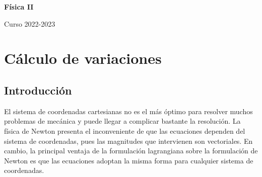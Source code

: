 \documentclass[12pt]{report}
\begin{document}
\newtheorem{proposition}{Proposición}[chapter]
\newtheorem{corollary}{Corolario}[chapter]
\newtheorem{theorem}{Teorema}[chapter]
\theoremstyle{definition}
\newtheorem{definition}{Definición}[chapter]
\theoremstyle{definition}
\newtheorem*{example}{Ejemplo}
\theoremstyle{remark}
\newtheorem*{obs}{Observación} %
\renewcommand*{\proofname}{Demostración}



\newcommand{\R}{\mathbb R}
\newcommand{\N}{\mathbb N}
\newcommand{\Z}{\mathbb Z}
\newcommand{\Q}{\mathbb Q}

\setlength{\abovedisplayskip}{10pt}
\setlength{\belowdisplayskip}{10pt}

\thispagestyle{empty} %

\begin{center}
    \vspace*{1cm} %
    \Huge \textbf{Física II}
        
    \vspace{10mm} %
    \large
        
    Curso 2022-2023
\end{center}

\tableofcontents

\thispagestyle{empty}

\chapter{Cálculo de variaciones}

\section{Introducción}

El sistema de coordenadas cartesianas no es el más óptimo para resolver muchos problemas de mecánica y puede llegar a complicar bastante la resolución. La física de Newton presenta el inconveniente de que las ecuaciones dependen del sistema de coordenadas, pues las magnitudes que intervienen son vectoriales. En cambio, la principal ventaja de la formulación lagrangiana sobre la formulación de Newton es que las ecuaciones adoptan la misma forma para cualquier sistema de coordenadas. 
\end{document}
